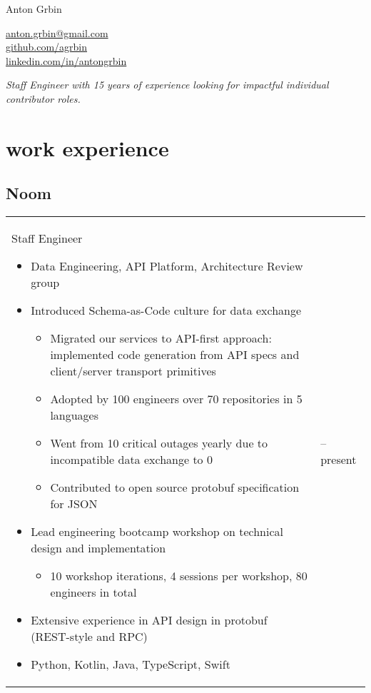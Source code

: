 \documentclass[a4paper]{article}
\makeatletter
\newlength{\tablewidth}
\newenvironment{period}[2]{%
\newcommand{\sarma}{#2}%
\setlength{\tablewidth}{\linewidth}
\addtolength{\tablewidth}{-2\tabcolsep}
\begin{tabular}{@{}p{0.75\tablewidth}>{\raggedleft\arraybackslash}p{0.25\tablewidth}@{}}%
#1 \newline
\begin{itemize}
}{%
\end{itemize} & \sarma \\%
\end{tabular}\\
}
\makeatother
\begin{document}
\fontfamily{\sfdefault}
\selectfont

\begin{minipage}{.5\textwidth}
\LARGE{Anton Grbin} \\
\end{minipage}%
\begin{minipage}{.5\textwidth}
\raggedleft
\href{mailto:anton.grbin@gmail.com}{anton.grbin@gmail.com} \\
\href{https://github.com/agrbin}{github.com/agrbin} \\
\href{https://linkedin.com/in/antongrbin/}{linkedin.com/in/antongrbin} \\

\end{minipage}

\textit{Staff Engineer with 15 years of experience looking for impactful individual contributor roles.}

\vspace{1em}

\section{work experience}

\subsection{Noom}
\begin{period}{Staff Engineer}{2019 -- present}
    \item Data Engineering, API Platform, Architecture Review group
    \item Introduced Schema-as-Code culture for data exchange
        \begin{itemize}
            \item Migrated our services to API-first approach: implemented code generation from API specs and client/server transport primitives
            \item Adopted by 100 engineers over 70 repositories in 5 languages
            \item Went from 10 critical outages yearly due to incompatible data exchange to 0
            \item Contributed to open source protobuf specification for JSON
        \end{itemize}
    \item Lead engineering bootcamp workshop on technical design and implementation
        \begin{itemize}
            \item 10 workshop iterations, 4 sessions per workshop, 80 engineers in total
        \end{itemize}
    \item Extensive experience in API design in protobuf (REST-style and RPC)
    \item Python, Kotlin, Java, TypeScript, Swift
\end{period}
\end{document}
